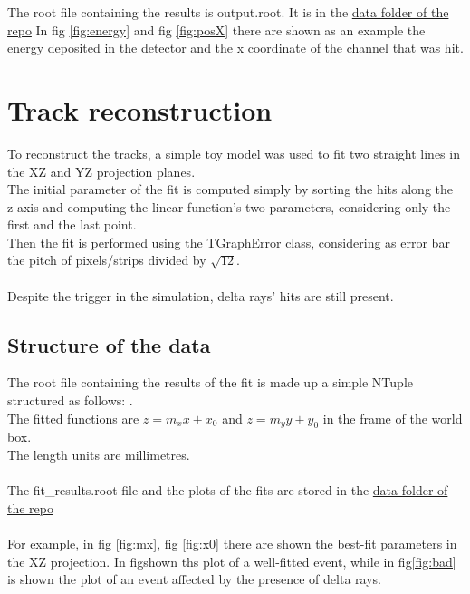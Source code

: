 \documentclass[10pt, a4paper, twocolumn]{article} %
\begin{document}
The root file containing the results is output.root. It is in the \href{https://github.com/pviscone/TrackG4/tree/main/data}{data folder of the repo}
In fig \ref{fig:energy} and fig \ref{fig:posX} there are shown as an example the energy deposited in the detector and the x coordinate of the channel that was hit.


\section{Track reconstruction}
To reconstruct the tracks, a simple toy model was used to fit two straight lines in the XZ and YZ projection planes.
\\
The initial parameter of the fit is computed simply by sorting the hits along the z-axis and computing the linear function's two parameters, considering only the first and the last point.\\
Then the fit is performed using the TGraphError class, considering as error bar the pitch of pixels/strips divided by $\sqrt{12}$.
\\
\\
Despite the trigger in the simulation, delta rays' hits are still present.
\\
\subsection{Structure of the data}
The root file containing the results of the fit is made up a simple NTuple structured as follows:
.
\\
The fitted functions are $z=m_x x+x_0$ and $z=m_y y +y_0$ in the frame of the world box.\\
The length units are millimetres.
\\
\\
The fit\_results.root file and the plots of the fits are stored in the \href{https://github.com/pviscone/TrackG4/tree/main/data}{data folder of the repo}
\\
\\
For example, in fig \ref{fig:mx}, fig \ref{fig:x0} there are shown the best-fit parameters in the XZ projection.
In fig shown ths plot of a well-fitted event, while in fig\ref{fig:bad} is shown the plot of an event affected by the presence of delta rays.
\end{document}
